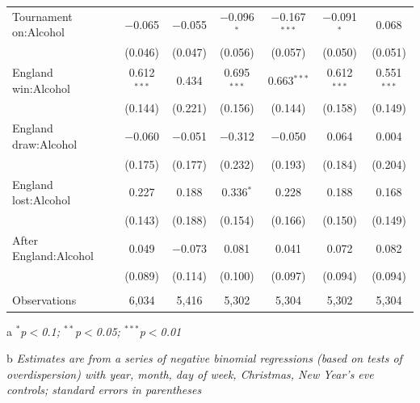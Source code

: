 \documentclass[12pt, letterpaper]{article}
\begin{document}
\begin{table}
{\begin{threeparttable}
\begin{tabular}{@{\extracolsep{5pt}}lcccccc}
  Tournament on:Alcohol & $-$0.065 & $-$0.055 & $-$0.096$^{*}$ & $-$0.167$^{***}$ & $-$0.091$^{*}$ & 0.068 \\ 
  & (0.046) & (0.047) & (0.056) & (0.057) & (0.050) & (0.051) \\ 
  England win:Alcohol & 0.612$^{***}$ & 0.434 & 0.695$^{***}$ & 0.663$^{***}$ & 0.612$^{***}$ & 0.551$^{***}$ \\ 
  & (0.144) & (0.221) & (0.156) & (0.144) & (0.158) & (0.149) \\ 
  England draw:Alcohol & $-$0.060 & $-$0.051 & $-$0.312 & $-$0.050 & 0.064 & 0.004 \\ 
  & (0.175) & (0.177) & (0.232) & (0.193) & (0.184) & (0.204) \\ 
  England lost:Alcohol & 0.227 & 0.188 & 0.336$^{*}$ & 0.228 & 0.188 & 0.168 \\ 
  & (0.143) & (0.188) & (0.154) & (0.166) & (0.150) & (0.149) \\ 
  After England:Alcohol & 0.049 & $-$0.073 & 0.081 & 0.041 & 0.072 & 0.082 \\ 
  & (0.089) & (0.114) & (0.100) & (0.097) & (0.094) & (0.094) \\ 
 \hline \\[-1.8ex] 
Observations & 6,034 & 5,416 & 5,302 & 5,304 & 5,302 & 5,304 \\ 
\hline 

\end{tabular} 
\begin{tablenotes}
      \item[a] \textit{$^{*}$p$<$0.1; $^{**}$p$<$0.05; $^{***}$p$<$0.01}
      \item[b] \textit{Estimates are from a series of negative binomial regressions (based on tests of overdispersion)  with year, month, day of week, Christmas, New Year's eve controls; standard errors in parentheses}
    \end{tablenotes}
\end{threeparttable} } 
\end{table}
\end{document}
